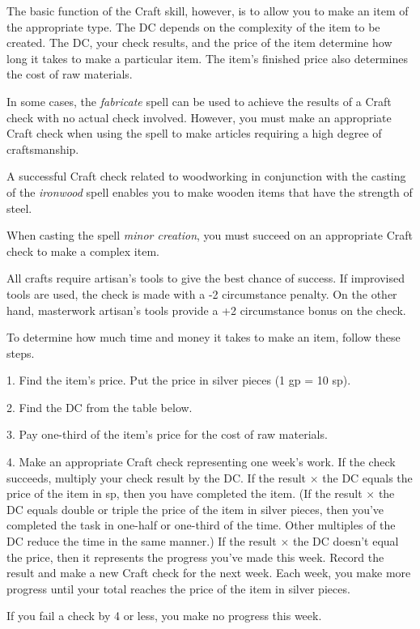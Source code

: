 \documentclass{article}
\begin{document}
The basic function of the Craft skill, however, is to allow you to make an item 
of the appropriate type. The DC depends on the complexity of the item to be created. 
The DC, your check results, and the price of the item determine how long it takes 
to make a particular item. The item's finished price also determines the cost of 
raw materials.

In some cases, the \textit{fabricate }spell can be used to achieve the results 
of a Craft check with no actual check involved. However, you must make an appropriate 
Craft check when using the spell to make articles requiring a high degree of craftsmanship.

A successful Craft check related to woodworking in conjunction with the casting 
of the \textit{ironwood }spell enables you to make wooden items that have the strength 
of steel.

When casting the spell \textit{minor creation}, you must succeed on an appropriate 
Craft check to make a complex item.

All crafts require artisan's tools to give the best chance of success. If improvised 
tools are used, the check is made with a -2 circumstance penalty. On the other 
hand, masterwork artisan's tools provide a +2 circumstance bonus on the check.

To determine how much time and money it takes to make an item, follow these steps.

1. Find the item's price. Put the price in silver pieces (1 gp = 10 sp).

2. Find the DC from the table below.

3. Pay one-third of the item's price for the cost of raw materials.

4. Make an appropriate Craft check representing one week's work. If the check succeeds, 
multiply your check result by the DC. If the result \ensuremath{\times} the DC 
equals the price of the item in sp, then you have completed the item. (If the result 
\ensuremath{\times} the DC equals double or triple the price of the item in silver 
pieces, then you've completed the task in one-half or one-third of the time. Other 
multiples of the DC reduce the time in the same manner.) If the result \ensuremath{\times} 
the DC doesn't equal the price, then it represents the progress you've made this 
week. Record the result and make a new Craft check for the next week. Each week, 
you make more progress until your total reaches the price of the item in silver 
pieces.

If you fail a check by 4 or less, you make no progress this week.
\end{document}
